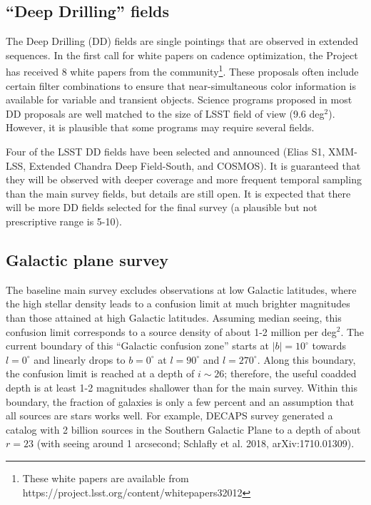 \documentclass[DM,lsstdraft,toc,usenatbib]{lsstdoc}
\begin{document}
\subsection{``Deep Drilling'' fields} 

The Deep Drilling (DD) fields are single pointings that are observed in extended sequences. 
In the first call for white papers on cadence optimization, the Project has received 
8 white papers from the community\footnote{These white papers are available from 
https://project.lsst.org/content/whitepapers32012}. These proposals often include certain 
filter combinations to ensure that near-simultaneous color information is available for 
variable and transient objects. Science programs proposed in most DD proposals are well 
matched to the size of LSST field of view (9.6 deg$^2$). However, it is plausible that some
programs may require several fields. 

Four of the LSST DD fields have been selected and announced (Elias S1, 
XMM-LSS, Extended Chandra Deep Field-South, and COSMOS). It is guaranteed that they 
will be observed with deeper coverage and more frequent temporal sampling than the main 
survey fields, but details are still open. It is expected that there will be more DD fields 
selected for the final survey (a plausible but not prescriptive range is 5-10). 


\subsection{Galactic plane survey \label{sec:GP}}

The baseline main survey excludes observations at low Galactic latitudes, where the high 
stellar density leads to a confusion limit at much brighter magnitudes than those attained 
at high Galactic latitudes. Assuming median seeing, this confusion limit corresponds to a
source density of about 1-2 million per deg$^2$. The current boundary of this ``Galactic
confusion zone'' starts at $|b|=10^\circ$ towards $l=0^\circ$ and linearly drops to $b=0^\circ$
at $l=90^\circ$ and $l=270^\circ$. Along this boundary, the confusion limit is reached at a
depth of $i \sim 26$; therefore, the useful coadded depth is at least 1-2 magnitudes 
shallower than for the main survey. Within this boundary, the fraction of galaxies is only
a few percent and an assumption that all sources are stars works well. For example, 
DECAPS survey generated a catalog with 2 billion sources in the Southern Galactic Plane
to a depth of about $r=23$ (with seeing around 1 arcsecond; Schlafly et al. 2018, 
arXiv:1710.01309). 
\end{document}
